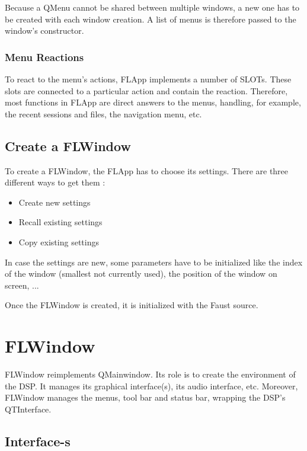 \documentclass[a4paper]{article}
\begin{document}
Because a QMenu cannot be shared between multiple windows, a new one has to be created with each window creation. A list of menus is therefore passed to the window's constructor.

\subsubsection{Menu Reactions}

To react to the menu's actions, FLApp implements a number of SLOTs. These slots are connected to a particular action and contain the reaction. Therefore, most functions in FLApp are direct answers to the menus, handling, for example, the recent sessions and files, the navigation menu, etc.

\subsection{Create a FLWindow}

To create a FLWindow, the FLApp has to choose its settings. There are three different ways to get them  :

\begin{itemize}
\item Create new settings
\item Recall existing settings
\item Copy existing settings
\end{itemize}

In case the settings are new, some parameters have to be initialized like the index of the window (smallest not currently used), the position of the window on screen, ...

Once the FLWindow is created, it is initialized with the Faust source.

\section{FLWindow}

FLWindow reimplements QMainwindow. Its role is to create the environment of the DSP. It manages its graphical interface(s), its audio interface, etc. Moreover, FLWindow manages the menus, tool bar and status bar, wrapping the DSP's QTInterface. 

\subsection{Interface-s}
\end{document}
